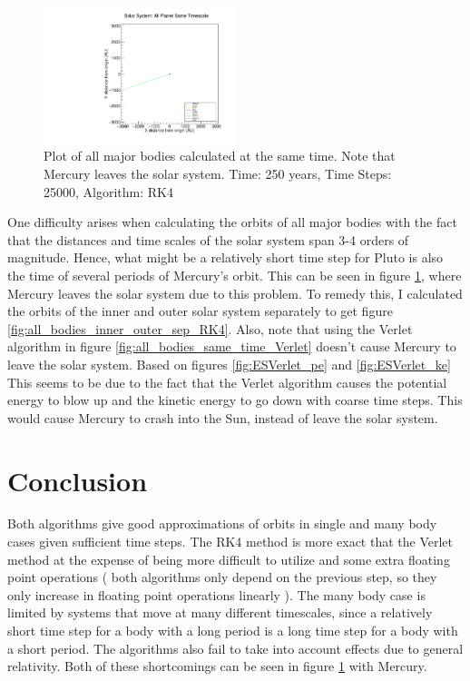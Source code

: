 \documentclass[a4paper,12pt]{report}
\begin{document}
 \begin{figure}
 \centering
   \includegraphics[width=0.5\textwidth]{all_bodies_same_time_RK4.pdf}
  \caption{Plot of all major bodies calculated at the same time. Note that Mercury leaves the solar system. Time: 250 years, Time Steps: 25000, Algorithm: RK4}
  \label{fig:all_bodies_same_time_RK4}
 \end{figure}
 One difficulty arises when calculating the orbits of all major bodies with the fact that the distances and time scales of the solar system span 3-4 orders of magnitude. Hence, what might be a relatively short time step for Pluto is also the time of several periods of Mercury's orbit. This can be seen in figure \ref{fig:all_bodies_same_time_RK4}, where Mercury leaves the solar system due to this problem. To remedy this, I calculated the orbits of the inner and outer solar system separately to get figure \ref{fig:all_bodies_inner_outer_sep_RK4}. Also, note that using the Verlet algorithm in figure \ref{fig:all_bodies_same_time_Verlet} doesn't cause Mercury to leave the solar system. Based on figures \ref{fig:ESVerlet_pe} and \ref{fig:ESVerlet_ke} This seems to be due to the fact that the Verlet algorithm causes the potential energy to blow up and the kinetic energy to go down with coarse time steps. This would cause Mercury to crash into the Sun, instead of leave the solar system.
 
\section{Conclusion}\label{sec:conclude}
Both algorithms give good approximations of orbits in single and many body cases given sufficient time steps. The RK4 method is more exact that the Verlet method at the expense of being more difficult to utilize and some extra floating point operations ( both algorithms only depend on the previous step, so they only increase in floating point operations linearly ). The many body case is limited by systems that move at many different timescales, since a relatively short time step for a body with a long period is a long time step for a body with a short period. The algorithms also fail to take into account effects due to general relativity. Both of these shortcomings can be seen in figure \ref{fig:all_bodies_same_time_RK4} with Mercury. 
\end{document}
